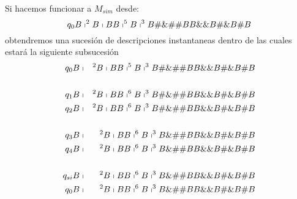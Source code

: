 \begin{frame}
  \PN Si hacemos funcionar a $M_{sim}$ desde:
  \[
    q_{0} B \shortmid^{2} B \shortmid BB \shortmid^{5} B \shortmid^{3} B \#\&\#\# BB \&\& B \#\& B \# B
  \]
  \PN obtendremos una sucesión de descripciones instantaneas dentro de las cuales estará la siguiente subsucesión
  \begin{eqnarray*}
    q_{0} B &\shortmid &^{2}B\shortmid BB\shortmid ^{5}B\shortmid
    ^{3}B\#\&\#\#BB\&\&B\#\&B\#B \\
    && \\
    q_{1}B &\shortmid &^{2}B\shortmid BB\shortmid ^{6}B\shortmid
    ^{3}B\#\&\#\#BB\&\&B\#\&B\#B \\
    q_{2}B &\shortmid &^{2}B\shortmid BB\shortmid ^{6}B\shortmid
    ^{3}B\#\&\#\#BB\&\&B\#\&B\#B \\
    && \\
    q_{3}B &\shortmid &^{2}B\shortmid BB\shortmid ^{6}B\shortmid
    ^{3}B\&\#\#BB\&\&B\#\&B\#B \\
    q_{4}B &\shortmid &^{2}B\shortmid BB\shortmid ^{6}B\shortmid
    ^{3}B\&\#\#BB\&\&B\#\&B\#B \\
    && \\
    q_{si}B &\shortmid &^{2}B\shortmid BB\shortmid ^{6}B\shortmid
    ^{3}B\&\#\#BB\&\&B\#\&B\#B \\
    q_{0}B &\shortmid &^{2}B\shortmid BB\shortmid ^{6}B\shortmid
    ^{3}B\&\#\#BB\&\&B\#\&B\#B \\
  \end{eqnarray*}
\end{frame}
